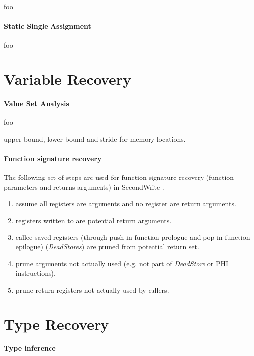 \documentclass[10pt, a4paper, sigplan, authordraft]{acmart}
\begin{document}
foo

\paragraph{Static Single Assignment}

foo


\section{Variable Recovery}

\paragraph{Value Set Analysis}

foo

upper bound, lower bound and stride for memory locations.

\paragraph{Function signature recovery}

The following set of steps are used for function signature recovery (function parameters and returns arguments) in SecondWrite \cite{second_write_scalable_type_detection}.

\begin{enumerate}
	\item assume all registers are arguments and no register are return arguments.
	\item registers written to are potential return arguments.
	\item callee saved registers (through push in function prologue and pop in function epilogue) (\textit{DeadStores}) are pruned from potential return set.
	\item prune arguments not actually used (e.g. not part of \textit{DeadStore} or PHI instructions).
	\item prune return registers not actually used by callers.
\end{enumerate}

\section{Type Recovery}

\paragraph{Type inference}
\end{document}
